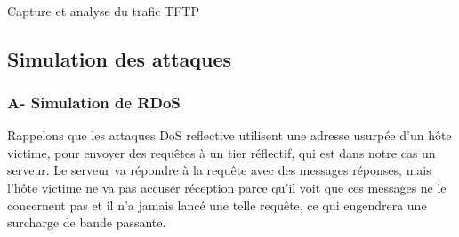 \begin{center}
\noindent{}%
\newline
\decoRule\\
Capture et analyse du trafic TFTP
\end{center}

\subsection{Simulation des attaques}
\subsubsection{A- Simulation de RDoS}
Rappelons que les attaques DoS reflective utilisent une adresse usurpée d'un hôte victime, pour envoyer des requêtes à un tier réflectif, qui est dans notre cas un serveur. Le serveur va répondre à la requête avec des messages réponses, mais l'hôte victime ne va pas accuser réception parce qu'il voit que ces messages ne le concernent pas et il n'a jamais lancé une telle requête, ce qui engendrera une surcharge de bande passante.\\


